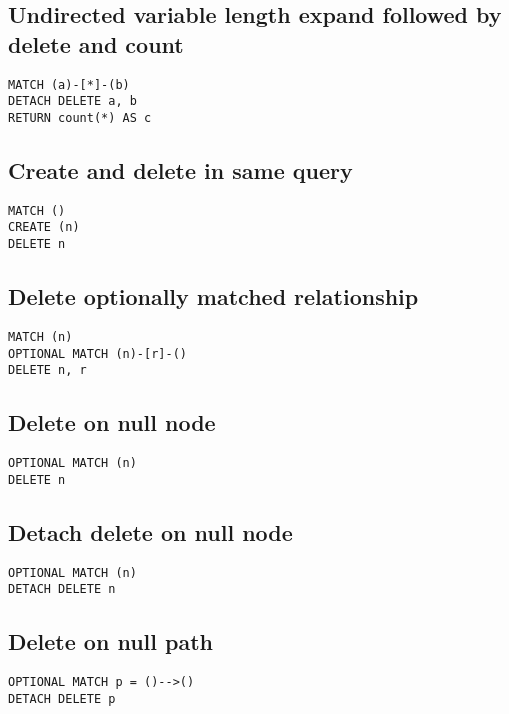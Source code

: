 \subsection{Undirected variable length expand followed by delete and count}

\begin{lstlisting}
MATCH (a)-[*]-(b)
DETACH DELETE a, b
RETURN count(*) AS c
\end{lstlisting}

\subsection{Create and delete in same query}

\begin{lstlisting}
MATCH ()
CREATE (n)
DELETE n
\end{lstlisting}

\subsection{Delete optionally matched relationship}

\begin{lstlisting}
MATCH (n)
OPTIONAL MATCH (n)-[r]-()
DELETE n, r
\end{lstlisting}

\subsection{Delete on null node}

\begin{lstlisting}
OPTIONAL MATCH (n)
DELETE n
\end{lstlisting}

\subsection{Detach delete on null node}

\begin{lstlisting}
OPTIONAL MATCH (n)
DETACH DELETE n
\end{lstlisting}

\subsection{Delete on null path}

\begin{lstlisting}
OPTIONAL MATCH p = ()-->()
DETACH DELETE p
\end{lstlisting}

